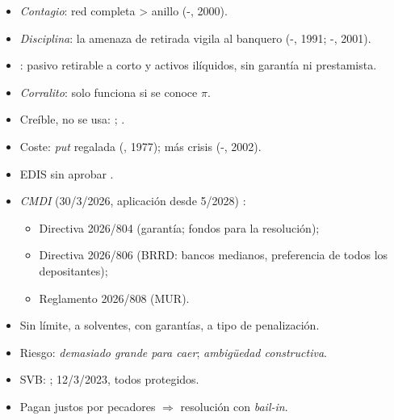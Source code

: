 \documentclass{article}
\begin{document}
\begin{columnas}
\begin{itemize}
\item \emph{Contagio}: red completa > anillo (-, 2000).
\item \emph{Disciplina}: la amenaza de retirada vigila al banquero (-, 1991; -, 2001).
\item {}: pasivo retirable a corto y activos ilíquidos, sin garantía ni prestamista.
\end{itemize}
\begin{itemize}
\item \emph{Corralito}: solo funciona si se conoce $\pi$.
\end{itemize}
\begin{itemize}
\item Creíble, no se usa: ; .
\item Coste: \emph{put} regalada (, 1977); más crisis (-, 2002).
\item EDIS sin aprobar .
\item \emph{CMDI} (30/3/2026, aplicación desde 5/2028) :
  \begin{itemize}
  \item Directiva 2026/804 (garantía; fondos para la resolución);
  \item Directiva 2026/806 (BRRD: bancos medianos, preferencia de todos los depositantes);
  \item Reglamento 2026/808 (MUR).
  \end{itemize}
\end{itemize}
\begin{itemize}
\item Sin límite, a solventes, con garantías, a tipo de penalización.
\item Riesgo: \emph{demasiado grande para caer}; \emph{ambigüedad constructiva}.
\item SVB: ; 12/3/2023, todos protegidos.
\item Pagan justos por pecadores $\Rightarrow$ resolución con \emph{bail-in}.
\end{itemize}
\begin{itemize}

\end{itemize}
\end{columnas}
\end{document}
